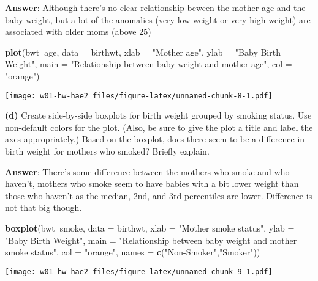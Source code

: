 \documentclass[]{article}
\newenvironment{Shaded}{\begin{snugshade}}{\end{snugshade}}
\newcommand{\KeywordTok}[1]{\textcolor[rgb]{0.13,0.29,0.53}{\textbf{#1}}}
\newcommand{\DataTypeTok}[1]{\textcolor[rgb]{0.13,0.29,0.53}{#1}}
\newcommand{\StringTok}[1]{\textcolor[rgb]{0.31,0.60,0.02}{#1}}
\newcommand{\OperatorTok}[1]{\textcolor[rgb]{0.81,0.36,0.00}{\textbf{#1}}}
\newcommand{\NormalTok}[1]{#1}
\begin{document}
\textbf{Answer}: Although there's no clear relationship beween the
mother age and the baby weight, but a lot of the anomalies (very low
weight or very high weight) are associated with older moms (above 25)

\begin{Shaded}
\begin{Highlighting}[]
\KeywordTok{plot}\NormalTok{(bwt}\OperatorTok{~}\NormalTok{age, }\DataTypeTok{data =}\NormalTok{ birthwt,}
     \DataTypeTok{xlab =} \StringTok{"Mother age"}\NormalTok{,}
     \DataTypeTok{ylab =} \StringTok{"Baby Birth Weight"}\NormalTok{,}
     \DataTypeTok{main =} \StringTok{"Relationship between baby weight and mother age"}\NormalTok{,}
     \DataTypeTok{col =} \StringTok{"orange"}\NormalTok{)}
\end{Highlighting}
\end{Shaded}

\texttt{[image: w01-hw-hae2\_files/figure-latex/unnamed-chunk-8-1.pdf]}

\textbf{(d)} Create side-by-side boxplots for birth weight grouped by
smoking status. Use non-default colors for the plot. (Also, be sure to
give the plot a title and label the axes appropriately.) Based on the
boxplot, does there seem to be a difference in birth weight for mothers
who smoked? Briefly explain.

\textbf{Answer}: There's some difference between the mothers who smoke
and who haven't, mothers who smoke seem to have babies with a bit lower
weight than those who haven't as the median, 2nd, and 3rd percentiles
are lower. Difference is not that big though.

\begin{Shaded}
\begin{Highlighting}[]
\KeywordTok{boxplot}\NormalTok{(bwt}\OperatorTok{~}\NormalTok{smoke, }\DataTypeTok{data =}\NormalTok{ birthwt,}
     \DataTypeTok{xlab =} \StringTok{"Mother smoke status"}\NormalTok{,}
     \DataTypeTok{ylab =} \StringTok{"Baby Birth Weight"}\NormalTok{,}
     \DataTypeTok{main =} \StringTok{"Relationship between baby weight and mother smoke status"}\NormalTok{,}
     \DataTypeTok{col =} \StringTok{"orange"}\NormalTok{,}
     \DataTypeTok{names =} \KeywordTok{c}\NormalTok{(}\StringTok{"Non-Smoker"}\NormalTok{,}\StringTok{"Smoker"}\NormalTok{))}
\end{Highlighting}
\end{Shaded}

\texttt{[image: w01-hw-hae2\_files/figure-latex/unnamed-chunk-9-1.pdf]}
\end{document}
